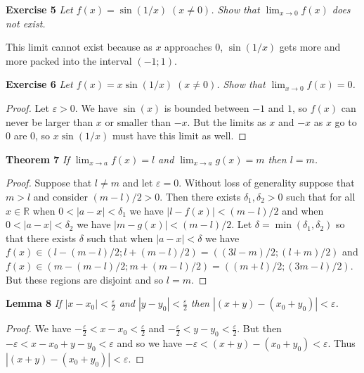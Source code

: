 \documentclass{article}
\begin{document}
\begin{flushleft}
\textbf{Exercise 5}
\textsl{Let $f(x)= \sin (1/x) \; (x \neq 0)$. Show that $\lim_{x \rightarrow 0} f(x)$ does not exist.}\newline

This limit cannot exist because as $x$ approaches $0$, $\sin (1/x)$ gets more and more packed into the interval $(-1;1)$.\newline

\textbf{Exercise 6}
\textsl{Let $f(x)=x \sin (1/x) \; (x \neq 0)$. Show that $\lim_{x \rightarrow 0} f(x) = 0$.}
\begin{proof}
Let $\varepsilon > 0$. We have $\sin (x)$ is bounded between $-1$ and $1$, so $f(x)$ can never be larger than $x$ or smaller than $-x$. But the limits as $x$ and $-x$ as $x$ go to $0$ are $0$, so $x \sin (1/x)$ must have this limit as well.
\end{proof}

\textbf{Theorem 7}
\textsl{If $\lim_{x \rightarrow a} f(x) = l$ and $\lim_{x \rightarrow a} g(x) = m$ then $l=m$.}
\begin{proof}
Suppose that $l \neq m$ and let $\varepsilon = 0$. Without loss of generality suppose that $m>l$ and consider $(m-l)/2 > 0$. Then there exists $\delta_1, \delta_2 > 0$ such that for all $x \in \mathbb{R}$ when $0 < |a-x| < \delta_1$ we have $|l-f(x)| < (m-l)/2$ and when $0 < |a-x| < \delta_2$ we have $|m-g(x)| < (m-l)/2$. Let $\delta = \min (\delta_1 , \delta_2)$ so that there exists $\delta$ such that when $|a-x| < \delta$ we have $f(x) \in (l - (m-l)/2 ; l + (m-l)/2) = ((3l-m)/2 ; (l+m)/2)$ and $f(x) \in (m-(m-l)/2 ; m+(m-l)/2)=((m+l)/2 ; (3m-l)/2)$. But these regions are disjoint and so $l=m$.
\end{proof}

\textbf{Lemma 8}
\textsl{If $|x-x_0| < \frac{\varepsilon}{2}$ and $|y-y_0| < \frac{\varepsilon}{2}$ then $|(x+y) - (x_0+y_0)| < \varepsilon$.}
\begin{proof}
We have $-\frac{\varepsilon}{2} < x-x_0 < \frac{\varepsilon}{2}$ and $-\frac{\varepsilon}{2} < y-y_0 < \frac{\varepsilon}{2}$. But then $-\varepsilon < x-x_0 + y-y_0 < \varepsilon$ and so we have $-\varepsilon < (x+y) - (x_0+y_0) < \varepsilon$. Thus $|(x+y) - (x_0+y_0)| < \varepsilon$.
\end{proof}


\end{flushleft}
\end{document}

